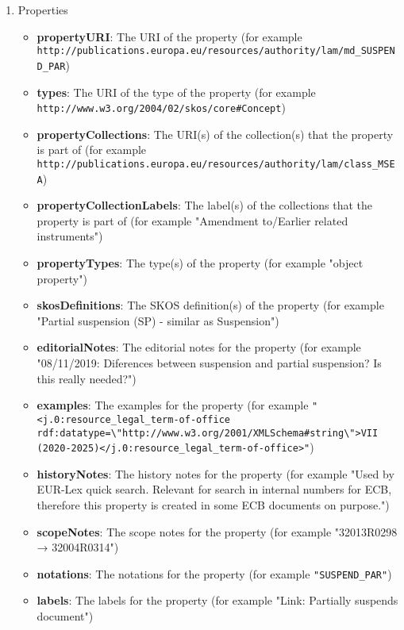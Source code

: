 \begin{enumerate}
\begin{itemize}
	\end{itemize}
	\item Properties
	\begin{itemize}
		\item \textbf{propertyURI}: The URI of the property (for example \lstinline!http://publications.europa.eu/resources/authority/lam/md_SUSPEND_PAR!)
		\item \textbf{types}: The URI of the type of the property (for example \lstinline!http://www.w3.org/2004/02/skos/core#Concept!) 
		\item \textbf{propertyCollections}: The URI(s) of the collection(s) that the property is part of (for example \lstinline!http://publications.europa.eu/resources/authority/lam/class_MSEA!)
		\item \textbf{propertyCollectionLabels}: The label(s) of the collections that the property is part of (for example "Amendment to/Earlier related instruments")
		\item \textbf{propertyTypes}: The type(s) of the property (for example "object property")
		\item \textbf{skosDefinitions}: The SKOS definition(s) of the property (for example "Partial suspension (SP) - similar as Suspension")
		\item \textbf{editorialNotes}: The editorial notes for the property (for example "08/11/2019: Diferences between suspension and partial suspension? Is this really needed?")
		\item \textbf{examples}: The examples for the property (for example \lstinline!"<j.0:resource_legal_term-of-office rdf:datatype=\"http://www.w3.org/2001/XMLSchema#string\">VII (2020-2025)</j.0:resource_legal_term-of-office>"!)
		\item \textbf{historyNotes}: The history notes for the property (for example "Used by EUR-Lex quick search. Relevant for search in internal numbers for ECB, therefore this property is created in some ECB documents on purpose.")
		\item \textbf{scopeNotes}: The scope notes for the property (for example "32013R0298 → 32004R0314")
		\item \textbf{notations}: The notations for the property (for example \lstinline!"SUSPEND_PAR"!) 
		\item \textbf{labels}: The labels for the property (for example "Link: Partially suspends document")
	\end{itemize}
\end{enumerate}
